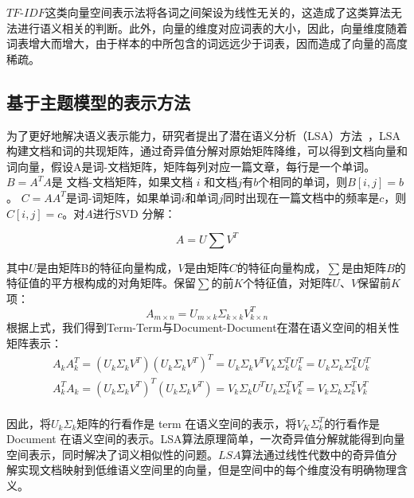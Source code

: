 $TF\textrm{-}IDF$这类向量空间表示法将各词之间架设为线性无关的，这造成了这类算法无法进行语义相关的判断。此外，向量的维度对应词表的大小，因此，向量维度随着词表增大而增大，由于样本的中所包含的词远远少于词表，因而造成了向量的高度稀疏。

\subsection{基于主题模型的表示方法}
为了更好地解决语义表示能力，研究者提出了潜在语义分析（LSA）方法~\cite{DeerwesterDLFH90}，LSA构建文档和词的共现矩阵，通过奇异值分解对原始矩阵降维，可以得到文档向量和词向量，假设A是词\textrm{-}文档矩阵，矩阵每列对应一篇文章，每行是一个单词。 $B = A^{T}A$是 文档\textrm{-}文档矩阵，如果文档 $i$ 和文档$j$有$b$个相同的单词，则$B[i,j]=b$。 $C = AA^{T}$是词\textrm{-}词矩阵，如果单词$i$和单词$j$同时出现在一篇文档中的频率是$c$，则$C[i,j]=c$。对$A$进行SVD 分解：

\begin{equation}
    A=U\sum V^{T}
\end{equation}

其中$U$是由矩阵B的特征向量构成，$V$是由矩阵$C$的特征向量构成，$\sum$是由矩阵$B$的特征值的平方根构成的对角矩阵。保留$\sum$的前$K$个特征值，对矩阵$U$、$V$保留前$K$项：
\begin{equation}
    A_{m\times n}=U_{m\times k}{\Sigma}_{k\times k}V^{T}_{k\times n}
\end{equation}
根据上式，我们得到Term\textrm{-}Term与Document\textrm{-}Document在潜在语义空间的相关性矩阵表示：
\begin{equation}
    \begin{aligned}
        & A_{k}A^{T}_{k}=(U_{k}{\Sigma}_{k}V^{T})(U_{k}{\Sigma}_{k}V^{T})^{T}=U_{k}{\Sigma}_{k}V^{T}V_{k}\Sigma_{k}^{T}U_{k}^{T}=U_{k}\Sigma_{k}\Sigma_{k}^{T}U_{k}^{T} \\
        & A^{T}_{k}A_{k}=(U_{k}{\Sigma}_{k}V^{T})^{T}(U_{k}{\Sigma}_{k}V^{T})=V_{k}{\Sigma}_{k}U^{T}U_{k}\Sigma_{k}^{T}V_{k}^{T}=V_{k}\Sigma_{k}\Sigma_{k}^{T}V_{k}^{T} \\
    \end{aligned}
\end{equation}

因此，将$U_k\Sigma_{k}$矩阵的行看作是 term 在语义空间的表示，将$V_{K}\Sigma_{k}^{T}$的行看作是 Document 在语义空间的表示。LSA算法原理简单，一次奇异值分解就能得到向量空间表示，同时解决了词义相似性的问题。$LSA$算法通过线性代数中的奇异值分解实现文档映射到低维语义空间里的向量，但是空间中的每个维度没有明确物理含义。

